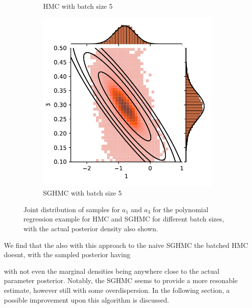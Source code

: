 \begin{figure}[htbp]
\begin{subfigure}[b]{0.4\textwidth}
        \caption{HMC with batch size 5}
    \end{subfigure}
    \begin{subfigure}[b]{0.4\textwidth}
        \centering
        \includegraphics[width=\textwidth]{Figures/simulated_joint_SGHMC_5.pdf} 
        \caption{SGHMC with batch size 5}
    \end{subfigure}
    \caption{Joint distribution of samples for $a_1$ and $a_3$ for the polynomial regression example for HMC and SGHMC for different batch sizes, with the actual posterior density also shown.}
    \label{fig:simulated_joint_comp}
\end{figure}
We find that the also with this approach to the naive SGHMC the batched HMC doesnt, with the sampled posterior having 

with not even the marginal densities being anywhere close to the actual parameter posterior.
Notably, the SGHMC seems to provide a more resonable estimate, however still with some overdispersion.
In the following section, a possible improvement upon this algorithm is discussed.

